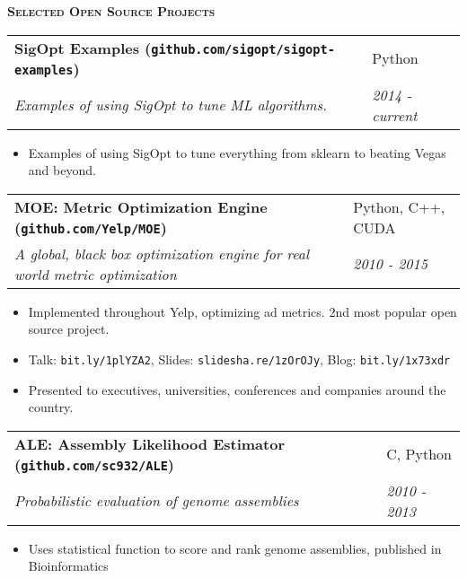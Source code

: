 \documentclass[letterpaper, 11pt]{article}
\makeatletter
\renewcommand{\section}[1]{%
  \begin{tcolorbox}
    \textsc{\textbf{\large{#1}}}
  \end{tcolorbox}
}
\newcommand{\entry}[4]{%
  \begin{tabularx}{\linewidth}{@{}Xl@{}}
    \textbf{#1} & #2          \\
    \textit{#3} & \textit{#4} \\
  \end{tabularx}
}
\makeatother
\begin{document}
  \section{Selected Open Source Projects}
  
  \entry{SigOpt Examples (\texttt{github.com/sigopt/sigopt-examples})}{Python}{Examples of using SigOpt to tune ML algorithms.}{2014 - current}
  \begin{itemize}
    \item{Examples of using SigOpt to tune everything from sklearn to beating Vegas and beyond.}
  \end{itemize}

  \entry{MOE: Metric Optimization Engine (\texttt{github.com/Yelp/MOE})}{Python, C++, CUDA}{A global, black box optimization engine for real world metric optimization}{2010 - 2015}
  \begin{itemize}
    \item{Implemented throughout Yelp, optimizing ad metrics. 2nd most popular open source project.}
    \item{Talk: \texttt{bit.ly/1plYZA2}, Slides: \texttt{slidesha.re/1zOrOJy}, Blog: \texttt{bit.ly/1x73xdr}}
    \item{Presented to executives, universities, conferences and companies around the country.}
  \end{itemize}

  \entry{ALE: Assembly Likelihood Estimator (\texttt{github.com/sc932/ALE})}{C, Python}{Probabilistic evaluation of genome assemblies}{2010 - 2013}
  \begin{itemize}
    \item{Uses statistical function to score and rank genome assemblies, published in Bioinformatics}
  \end{itemize}
\end{document}
